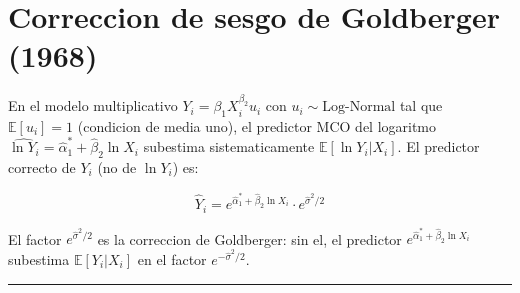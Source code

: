 \documentclass[12pt, letterpaper]{article}
\theoremstyle{remark}
\newcommand{\E}{\mathbb{E}}
\begin{document}
\section{Correccion de sesgo de Goldberger (1968)}

En el modelo multiplicativo $Y_i = \beta_1 X_i^{\beta_2} u_i$ con
$u_i \sim \text{Log-Normal}$ tal que $\E[u_i] = 1$ (condicion de media uno),
el predictor MCO del logaritmo $\widehat{\ln Y_i} = \hat\alpha_1^* + \hat\beta_2 \ln X_i$
subestima sistematicamente $\E[\ln Y_i | X_i]$. El predictor correcto de $Y_i$
(no de $\ln Y_i$) es:

\begin{equation}
  \hat Y_i = e^{\hat\alpha_1^* + \hat\beta_2\ln X_i} \cdot e^{\hat\sigma^2/2}
  \label{eq:predictor_Goldberger}
\end{equation}

El factor $e^{\hat\sigma^2/2}$ es la correccion de Goldberger: sin el, el
predictor $e^{\hat\alpha_1^* + \hat\beta_2\ln X_i}$ subestima $\E[Y_i | X_i]$
en el factor $e^{-\hat\sigma^2/2}$.

\vspace{14pt}
\noindent\rule{\linewidth}{0.4pt}

\end{document}
